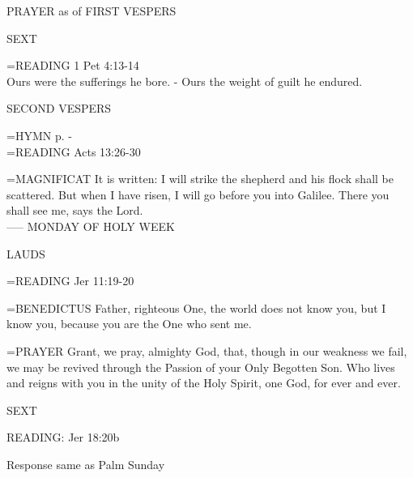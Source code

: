\begin{flushleft}\normalsize PRAYER as of FIRST VESPERS\\\end{flushleft}

\begin{flushleft}\normalsize SEXT\\\end{flushleft}
\hangindent=\parindent \small{\uppercase{READING}}    1 Pet 4:13-14 \textbf{   \\}
Ours were the sufferings he bore.
- Ours the weight of guilt he endured.

\begin{flushleft}\normalsize SECOND VESPERS\\\end{flushleft}
\hangindent=\parindent \small{\uppercase{HYMN} p. \pageref{lent:firstHymn}-\pageref{lent:lastHymn}\\}
\hangindent=\parindent \small{\uppercase{READING}}    Acts 13:26-30 \textbf{   \\}

\hangindent=\parindent \small{MAGNIFICAT 	It is written: I will strike the shepherd and his flock shall be scattered. But when I have risen, I will go before you into Galilee. There you shall see me, says the Lord.\\}
-----
MONDAY OF HOLY WEEK

\begin{flushleft}\normalsize LAUDS\\\end{flushleft}
\hangindent=\parindent \small{\uppercase{READING}}    Jer 11:19-20 \textbf{   \\}

\hangindent=\parindent \small{BENEDICTUS 	Father, righteous One, the world does not know you, but I know you, because you are the One who sent me.\\}

\hangindent=\parindent \small{PRAYER 	Grant, we pray, almighty God, that, though in our weakness we fail, we may be revived through the Passion of your Only Begotten Son. Who lives and reigns with you in the unity of the Holy Spirit, one God, for ever and ever.}

\begin{flushleft}\normalsize SEXT\\\end{flushleft}
READING:    Jer 18:20b

Response same as Palm Sunday

